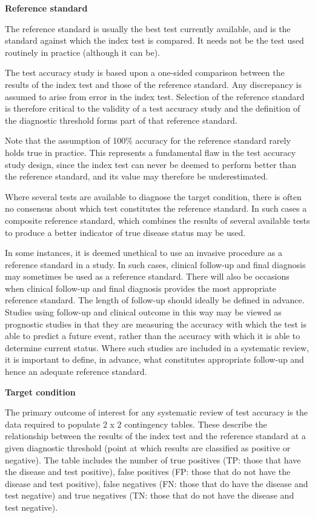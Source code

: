 \documentclass[
  11pt,
  a4paper,
  DIV=11,
  numbers=noendperiod]{scrreprt}
\begin{document}
\textbf{Reference standard}

The reference standard is usually the best test currently available, and
is the standard against which the index test is compared. It needs not
be the test used routinely in practice (although it can be).

The test accuracy study is based upon a one-sided comparison between the
results of the index test and those of the reference standard. Any
discrepancy is assumed to arise from error in the index test. Selection
of the reference standard is therefore critical to the validity of a
test accuracy study and the definition of the diagnostic threshold forms
part of that reference standard.

Note that the assumption of 100\% accuracy for the reference standard
rarely holds true in practice. This represents a fundamental flaw in the
test accuracy study design, since the index test can never be deemed to
perform better than the reference standard, and its value may therefore
be underestimated.

Where several tests are available to diagnose the target condition,
there is often no consensus about which test constitutes the reference
standard. In such cases a composite reference standard, which combines
the results of several available tests to produce a better indicator of
true disease status may be used.

In some instances, it is deemed unethical to use an invasive procedure
as a reference standard in a study. In such cases, clinical follow-up
and final diagnosis may sometimes be used as a reference standard. There
will also be occasions when clinical follow-up and final diagnosis
provides the most appropriate reference standard. The length of
follow-up should ideally be defined in advance. Studies using follow-up
and clinical outcome in this way may be viewed as prognostic studies in
that they are measuring the accuracy with which the test is able to
predict a future event, rather than the accuracy with which it is able
to determine current status. Where such studies are included in a
systematic review, it is important to define, in advance, what
constitutes appropriate follow-up and hence an adequate reference
standard.

\textbf{Target condition}

The primary outcome of interest for any systematic review of test
accuracy is the data required to populate 2 x 2 contingency tables.
These describe the relationship between the results of the index test
and the reference standard at a given diagnostic threshold (point at
which results are classified as positive or negative). The table
includes the number of true positives (TP: those that have the disease
and test positive), false positives (FP: those that do not have the
disease and test positive), false negatives (FN: those that do have the
disease and test negative) and true negatives (TN: those that do not
have the disease and test negative).
\end{document}
